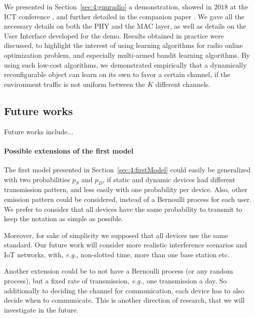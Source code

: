 We presented in Section~\ref{sec:4:gnuradio} a demonstration, showed in $2018$ at the ICT conference \cite{Besson2018ICT}, and further detailed in the companion paper \cite{Besson2019WCNC}.
We gave all the necessary details on both the PHY and the MAC layer, as well as details on the User Interface developed for the demo.
Results obtained in practice were discussed, to highlight the interest of using learning algorithms for radio online optimization problem, and especially multi-armed bandit learning algorithms.
%
By using such low-cost algorithms, we demonstrated empirically that a dynamically reconfigurable object can learn on its own to favor a certain channel, if the environment traffic is not uniform between the $K$ different channels.



\subsection{Future works}
Future works include...


\paragraph{Possible extensions of the first model}
%
The first model presented in Section~\ref{sec:4:firstModel} could easily be generalized with two probabilities $p_S$ and $p_D$, if static and dynamic devices had different transmission pattern, and less easily with one probability per device. Also, other emission pattern could be considered, instead of a Bernoulli process for each user.
We prefer to consider that all devices have the same probability to transmit to keep the notation as simple as possible.

Moreover, for sake of simplicity we supposed that all devices use the same standard. Our future work will consider more realistic interference scenarios and IoT networks, with, \emph{e.g.}, non-slotted time, more than one base station etc.

Another extension could be to not have a Bernoulli process (or any random process), but a fixed rate of transmission, \emph{e.g.}, one transmission a day.
So additionally to deciding the channel for communication, each device has to also decide when to communicate.
This is another direction of research, that we will investigate in the future.


